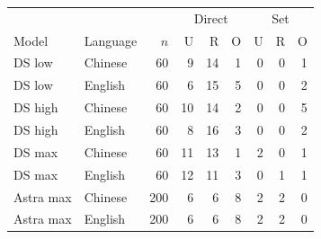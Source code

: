 \begin{tabular}{llrrrrrrr}
\toprule
&&&\multicolumn{3}{c}{Direct}&\multicolumn{3}{c}{Set}\\
Model & Language & $n$ & U & R & O & U & R & O \\
\midrule
DS low & Chinese & 60 & 9 & 14 & 1 & 0 & 0 & 1 \\
DS low & English & 60 & 6 & 15 & 5 & 0 & 0 & 2 \\
\midrule
DS high & Chinese & 60 & 10 & 14 & 2 & 0 & 0 & 5 \\
DS high & English & 60 & 8 & 16 & 3 & 0 & 0 & 2 \\
\midrule
DS max & Chinese & 60 & 11 & 13 & 1 & 2 & 0 & 1 \\
DS max & English & 60 & 12 & 11 & 3 & 0 & 1 & 1 \\
\midrule
Astra max & Chinese & 200 & 6 & 6 & 8 & 2 & 2 & 0 \\
Astra max & English & 200 & 6 & 6 & 8 & 2 & 2 & 0 \\
\bottomrule
\end{tabular}

